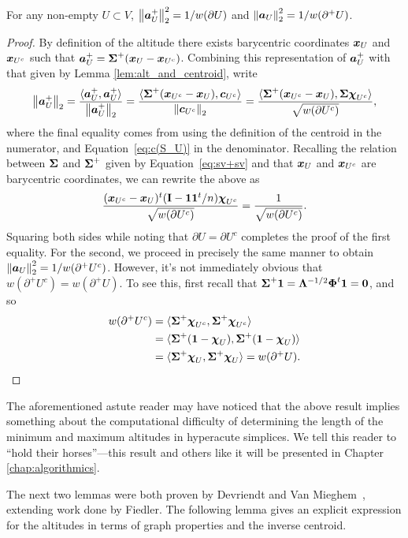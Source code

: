 \begin{lemma}
\label{lem:||alt||}
For any non-empty $U\subset V$, $\norm{\vb*{a}^+_U}_2^2=1/w(\partial U)$ and $\norm{\vb*{a}_U}_2^2 = 1/w(\partial^+ U)$.  
\end{lemma}
\begin{proof}
By definition of the altitude there exists barycentric coordinates $\vb*{x}_U$ and $\vb*{x}_{U^c}$ such that $\vb*{a}^+_U = \boldsymbol{\Sigma}^+(\vb*{x}_U-\vb*{x}_{U^c})$. Combining this representation of $\vb*{a}^+_U$ with that given by Lemma \ref{lem:alt_and_centroid}, write 
\begin{align*}
    \norm{\vb*{a}^+_U}_2 = \frac{\langle \vb*{a}^+_U,\vb*{a}^+_U\rangle }{\norm{\vb*{a}^+_U}_2} = \frac{\langle \boldsymbol{\Sigma}^+(\vb*{x}_{U^c}-\vb*{x}_{U}), \vb*{c}_{U^c}\rangle }{\norm{\vb*{c}_{U^c}}_2} = \frac{\langle \boldsymbol{\Sigma}^+(\vb*{x}_{U^c}-\vb*{x}_{U}), \boldsymbol{\Sigma}\boldsymbol{\chi}_{U^c}\rangle }{\sqrt{w(\partial U^c)}},
\end{align*}
where the final equality comes from using the definition of the centroid in the numerator, and Equation~\eqref{eq:c(S_U)} in the denominator. Recalling the relation between $\boldsymbol{\Sigma}$ and $\boldsymbol{\Sigma}^+$ given by Equation~\eqref{eq:sv+sv} and that $\vb*{x}_U$ and $\vb*{x}_{U^c}$ are barycentric coordinates, we can rewrite the above as 
\[\frac{(\vb*{x}_{U^c}-\vb*{x}_{U})^t(\vb{I}-\vb{1}\vb{1}^t/n)\boldsymbol{\chi}_{U^c}}{\sqrt{w(\partial U^c)}}=\frac{1}{\sqrt{w(\partial U^c)}}. \]
Squaring both sides while noting that $\partial U = \partial U^c$ completes the proof of the first equality. For the second, we proceed in precisely the same manner to obtain $\norm{\vb*{a}_U}_2^2 = 1/w(\partial^+ U^c)$. However, it's not immediately obvious that $w(\partial^+U^c)=w(\partial^+U)$. To see this, first recall that $\boldsymbol{\Sigma}^+\vb{1} = \vb{\Lambda}^{-1/2}\boldsymbol{\Phi}^t\vb{1} = \vb{0}$, and so 
\begin{align*}
w(\partial^+ U^c) &= \langle \boldsymbol{\Sigma}^+\boldsymbol{\chi}_{U^c},\boldsymbol{\Sigma}^+\boldsymbol{\chi}_{U^c}\rangle  \\
&= \langle \boldsymbol{\Sigma}^+(\vb{1} - \boldsymbol{\chi}_{U}),\boldsymbol{\Sigma}^+(\vb{1} - \boldsymbol{\chi}_{U})\rangle  \\
&= \langle \boldsymbol{\Sigma}^+\boldsymbol{\chi}_{U},\boldsymbol{\Sigma}^+\boldsymbol{\chi}_{U}\rangle = w(\partial^+ U).
\qedhere
\end{align*}
\end{proof}

The aforementioned astute reader may have noticed that the above result implies something about the computational difficulty of determining the length of the minimum and maximum altitudes in hyperacute simplices. We tell this reader to ``hold their horses''---this result and others like it will be presented in Chapter \ref{chap:algorithmics}. 

The next two lemmas were both proven by Devriendt and Van Mieghem~\cite{devriendt2018simplex}, extending work done by Fiedler. 
The following lemma gives an explicit expression for the altitudes in terms of graph properties and the inverse centroid. 


